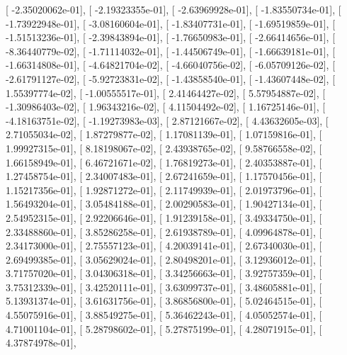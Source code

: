 \documentclass{article}
\begin{document}
       [ -2.35020062e-01],
       [ -2.19323355e-01],
       [ -2.63969928e-01],
       [ -1.83550734e-01],
       [ -1.73922948e-01],
       [ -3.08160604e-01],
       [ -1.83407731e-01],
       [ -1.69519859e-01],
       [ -1.51513236e-01],
       [ -2.39843894e-01],
       [ -1.76650983e-01],
       [ -2.66414656e-01],
       [ -8.36440779e-02],
       [ -1.71114032e-01],
       [ -1.44506749e-01],
       [ -1.66639181e-01],
       [ -1.66314808e-01],
       [ -4.64821704e-02],
       [ -4.66040756e-02],
       [ -6.05709126e-02],
       [ -2.61791127e-02],
       [ -5.92723831e-02],
       [ -1.43858540e-01],
       [ -1.43607448e-02],
       [  1.55397774e-02],
       [ -1.00555517e-01],
       [  2.41464427e-02],
       [  5.57954887e-02],
       [ -1.30986403e-02],
       [  1.96343216e-02],
       [  4.11504492e-02],
       [  1.16725146e-01],
       [ -4.18163751e-02],
       [ -1.19273983e-03],
       [  2.87121667e-02],
       [  4.43632605e-03],
       [  2.71055034e-02],
       [  1.87279877e-02],
       [  1.17081139e-01],
       [  1.07159816e-01],
       [  1.99927315e-01],
       [  8.18198067e-02],
       [  2.43938765e-02],
       [  9.58766558e-02],
       [  1.66158949e-01],
       [  6.46721671e-02],
       [  1.76819273e-01],
       [  2.40353887e-01],
       [  1.27458754e-01],
       [  2.34007483e-01],
       [  2.67241659e-01],
       [  1.17570456e-01],
       [  1.15217356e-01],
       [  1.92871272e-01],
       [  2.11749939e-01],
       [  2.01973796e-01],
       [  1.56493204e-01],
       [  3.05484188e-01],
       [  2.00290583e-01],
       [  1.90427134e-01],
       [  2.54952315e-01],
       [  2.92206646e-01],
       [  1.91239158e-01],
       [  3.49334750e-01],
       [  2.33488860e-01],
       [  3.85286258e-01],
       [  2.61938789e-01],
       [  4.09964878e-01],
       [  2.34173000e-01],
       [  2.75557123e-01],
       [  4.20039141e-01],
       [  2.67340030e-01],
       [  2.69499385e-01],
       [  3.05629024e-01],
       [  2.80498201e-01],
       [  3.12936012e-01],
       [  3.71757020e-01],
       [  3.04306318e-01],
       [  3.34256663e-01],
       [  3.92757359e-01],
       [  3.75312339e-01],
       [  3.42520111e-01],
       [  3.63099737e-01],
       [  3.48605881e-01],
       [  5.13931374e-01],
       [  3.61631756e-01],
       [  3.86856800e-01],
       [  5.02464515e-01],
       [  4.55075916e-01],
       [  3.88549275e-01],
       [  5.36462243e-01],
       [  4.05052574e-01],
       [  4.71001104e-01],
       [  5.28798602e-01],
       [  5.27875199e-01],
       [  4.28071915e-01],
       [  4.37874978e-01],
\end{document}
